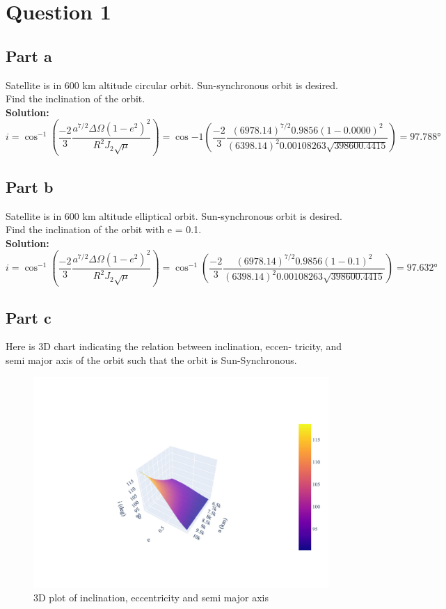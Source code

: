 \section{Question 1}
\subsection{Part a}
Satellite is in 600 km altitude circular orbit. Sun-synchronous orbit is desired. Find the inclination of the orbit.\\
\textbf{Solution:}\\
\begin{equation}
    i = \cos^{-1} \left(\dfrac{-2}{3} \dfrac{a^{7/2} \Delta \Omega (1-e^2)^2}{R^2 J_2 \sqrt{\mu}} \right) = \cos{-1} \left(\dfrac{-2}{3} \dfrac{(6978.14)^{7/2} 0.9856 (1-0.0000)^2}{(6398.14)^2 0.00108263 \sqrt{398600.4415}} \right) =\ang{97.788}
\end{equation}
\subsection{Part b}
Satellite is in 600 km altitude elliptical orbit.
 Sun-synchronous orbit is desired. Find the inclination of the orbit with e = 0.1.\\
\textbf{Solution:}\\
\begin{equation}
    i = \cos^{-1} \left(\dfrac{-2}{3} \dfrac{a^{7/2} \Delta \Omega (1-e^2)^2}{R^2 J_2 \sqrt{\mu}} \right) = \cos^{-1} \left(\dfrac{-2}{3} \dfrac{(6978.14)^{7/2} 0.9856 (1-0.1)^2}{(6398.14)^2 0.00108263 \sqrt{398600.4415}} \right) =\ang{97.632}
\end{equation}
\subsection{Part c}
Here is 3D chart indicating the relation between inclination, eccen-
tricity, and semi major axis of the orbit such that the orbit is Sun-Synchronous.
\begin{figure}[H]
    \centering
    \includegraphics[width=\textwidth]{../Figure/Q1/3d_plot}
    \caption{3D plot of inclination, eccentricity and semi major axis}
\end{figure}
